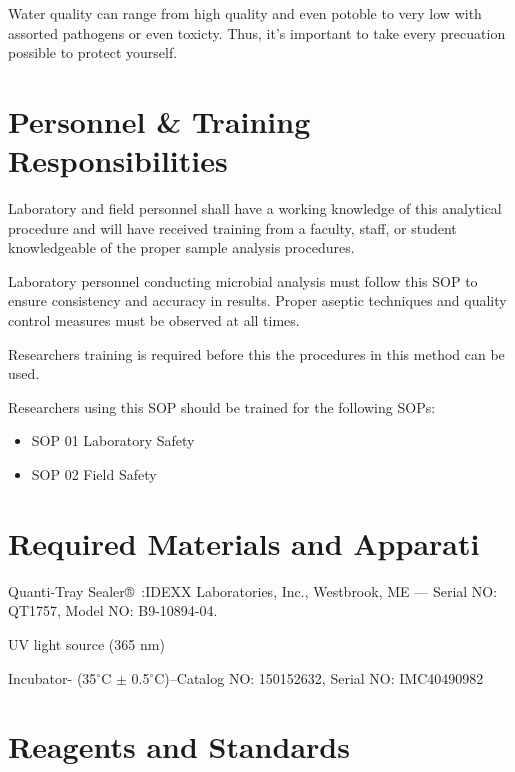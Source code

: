\documentclass[12pt]{../SOP4_alpha}\usepackage[]{graphicx}\usepackage[]{xcolor}
\begin{document}
Water quality can range from high quality and even potoble to very low with assorted pathogens or even toxicty. Thus, it's important to take every precuation possible to protect yourself. 

\section{Personnel \& Training Responsibilities}

\NP Laboratory and field personnel shall have a working knowledge of this analytical procedure and will have received training from a faculty, staff, or student knowledgeable of the proper sample analysis procedures. 

\NP Laboratory personnel conducting microbial analysis must follow this SOP to ensure consistency and accuracy in results. Proper aseptic techniques and quality control measures must be observed at all times.

\NP Researchers training is required before this the procedures in this method can be used.

\NP Researchers using this SOP should be trained for the following SOPs:

\begin{itemize}
  \item SOP 01 Laboratory Safety
  \item SOP 02 Field Safety
\end{itemize}

\section{Required Materials and Apparati}

\NP Quanti-Tray Sealer®\textregistered ~:IDEXX Laboratories, Inc., Westbrook, ME --- Serial NO: QT1757, Model NO: B9-10894-04.

\NP UV light source (365 nm)

\NP Incubator- (35$^{\circ}$C $\pm$ 0.5$^{\circ}$C)--Catalog NO: 150152632, Serial NO: IMC40490982


\section{Reagents and Standards}
\end{document}
